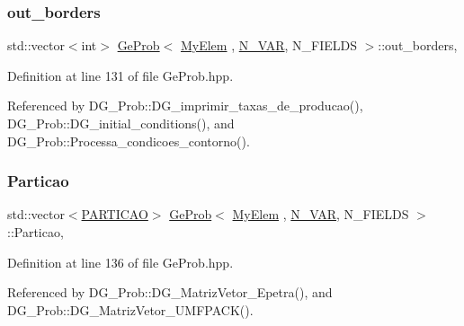 \subsubsection{\texorpdfstring{out\+\_\+borders}{out\_borders}}
{\footnotesize\ttfamily std\+::vector$<$int$>$ \hyperlink{classGeProb}{Ge\+Prob}$<$ \hyperlink{DG__Prob_8h_a83cd887ced9a6587428f267e50cd4787}{My\+Elem} , \hyperlink{classED__Prob_a4e7d2ff1a8e435e336fb00c527224b5a}{N\+\_\+\+V\+AR}, N\+\_\+\+F\+I\+E\+L\+DS $>$\+::out\+\_\+borders\hspace{0.3cm}{\ttfamily [protected]}, {\ttfamily [inherited]}}



Definition at line 131 of file Ge\+Prob.\+hpp.



Referenced by D\+G\+\_\+\+Prob\+::\+D\+G\+\_\+imprimir\+\_\+taxas\+\_\+de\+\_\+producao(), D\+G\+\_\+\+Prob\+::\+D\+G\+\_\+initial\+\_\+conditions(), and D\+G\+\_\+\+Prob\+::\+Processa\+\_\+condicoes\+\_\+contorno().

\mbox{\label{classGeProb_a39012a295f18016463a00946affc3818}} 
\subsubsection{\texorpdfstring{Particao}{Particao}}
{\footnotesize\ttfamily std\+::vector$<$\hyperlink{structPARTICAO}{P\+A\+R\+T\+I\+C\+AO}$>$ \hyperlink{classGeProb}{Ge\+Prob}$<$ \hyperlink{DG__Prob_8h_a83cd887ced9a6587428f267e50cd4787}{My\+Elem} , \hyperlink{classED__Prob_a4e7d2ff1a8e435e336fb00c527224b5a}{N\+\_\+\+V\+AR}, N\+\_\+\+F\+I\+E\+L\+DS $>$\+::Particao\hspace{0.3cm}{\ttfamily [protected]}, {\ttfamily [inherited]}}



Definition at line 136 of file Ge\+Prob.\+hpp.



Referenced by D\+G\+\_\+\+Prob\+::\+D\+G\+\_\+\+Matriz\+Vetor\+\_\+\+Epetra(), and D\+G\+\_\+\+Prob\+::\+D\+G\+\_\+\+Matriz\+Vetor\+\_\+\+U\+M\+F\+P\+A\+C\+K().

\mbox{\label{classGeProb_aecb008dc7914d62933407aecbcbbae0a}} 
